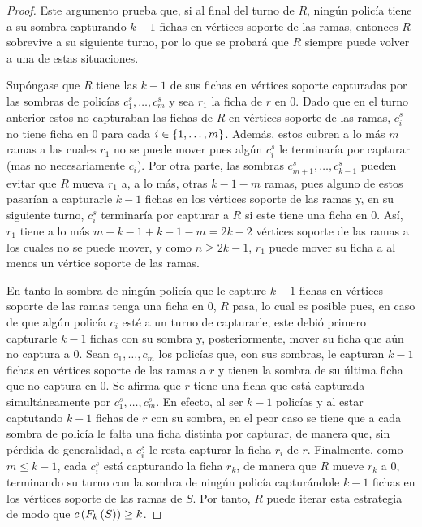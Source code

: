 \begin{proof}
    Este argumento prueba que, si al final del turno de $R$, ning\'un polic\'ia
    tiene a su sombra capturando $k-1$ fichas en v\'ertices soporte de las
    ramas, entonces $R$ sobrevive a su siguiente turno, por lo que se probar\'a
    que $R$ siempre puede volver a una de estas situaciones.

    Sup\'ongase que $R$ tiene las $k-1$ de sus fichas en v\'ertices soporte
    capturadas por las sombras de polic\'ias $c_1^s,\dots, c_m^s$ y sea $r_1$ la
    ficha de $r$ en $0$. Dado que en el turno anterior estos no capturaban las
    fichas de $R$ en v\'ertices soporte de las ramas, $c_{i}^s$ no tiene ficha
    en $0$ para cada $i\in\{1,\dots, m\}$. Adem\'as, estos cubren a lo m\'as $m$
    ramas a las cuales $r_1$ no se puede mover pues alg\'un $c_{i}^s$ le
    terminar\'ia por capturar (mas no necesariamente $c_i$). Por otra parte, las
    sombras $c_{m+1}^s,\dots,c_{k-1}^s$ pueden evitar que $R$ mueva $r_1$ a, a
    lo m\'as, otras $k-1-m$ ramas, pues alguno de estos pasar\'ian a capturarle
    $k-1$ fichas en los v\'ertices soporte de las ramas y, en su siguiente
    turno, $c_i^s$ terminar\'ia por capturar a $R$ si este tiene una ficha en
    $0$. As\'i, $r_1$ tiene a lo m\'as $m+k-1+k-1-m = 2k-2$ v\'ertices soporte
    de las ramas a los cuales no se puede mover, y como $n\geq 2k-1$, $r_1$
    puede mover su ficha a al menos un v\'ertice soporte de las ramas.

    En tanto la sombra de ning\'un polic\'ia que le capture $k-1$ fichas en
    v\'ertices soporte de las ramas tenga una ficha en $0$, $R$ pasa, lo cual es
    posible pues, en caso de que alg\'un polic\'ia $c_i$ est\'e a un turno de
    capturarle, este debi\'o primero capturarle $k-1$ fichas con su sombra y,
    posteriormente, mover su ficha que a\'un no captura a $0$. Sean
    $c_1,\dots,c_m$ los polic\'ias que, con sus sombras, le capturan $k-1$
    fichas en v\'ertices soporte de las ramas a $r$ y tienen la sombra de su
    \'ultima ficha que no captura en $0$. Se afirma que $r$ tiene una ficha que
    est\'a capturada simult\'aneamente por $c_1^s,\dots, c_m^s$. En efecto, al
    ser $k-1$ polic\'ias y al estar captutando $k-1$ fichas de $r$ con su
    sombra, en el peor caso se tiene que a cada sombra de polic\'ia le falta una
    ficha distinta por capturar, de manera que, sin p\'erdida de generalidad, a
    $c_i^s$ le resta capturar la ficha $r_i$ de $r$. Finalmente, como $m\leq
    k-1$, cada $c_i^s$ est\'a capturando la ficha $r_k$, de manera que $R$ mueve
    $r_k$ a $0$, terminando su turno con la sombra de ning\'un polic\'ia
    captur\'andole $k-1$ fichas en los v\'ertices soporte de las ramas de $S$.
    Por tanto, $R$ puede iterar esta estrategia de modo que $c\left( F_{k}\left( S\right)\right)
    \geq k$.

\end{proof}


